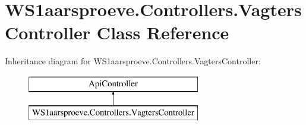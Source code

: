 \hypertarget{class_w_s1aarsproeve_1_1_controllers_1_1_vagters_controller}{}\section{W\+S1aarsproeve.\+Controllers.\+Vagters\+Controller Class Reference}
\label{class_w_s1aarsproeve_1_1_controllers_1_1_vagters_controller}
Inheritance diagram for W\+S1aarsproeve.\+Controllers.\+Vagters\+Controller\+:\begin{figure}[H]
\begin{center}
\leavevmode
\includegraphics[height=2.000000cm]{class_w_s1aarsproeve_1_1_controllers_1_1_vagters_controller}
\end{center}
\end{figure}
